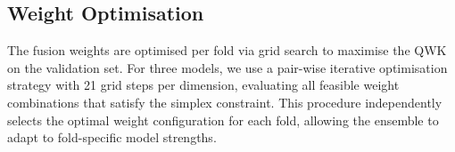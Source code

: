 \subsection{Weight Optimisation}

The fusion weights are optimised per fold via grid search to maximise the QWK on the validation set. For three models, we use a pair-wise iterative optimisation strategy with 21 grid steps per dimension, evaluating all feasible weight combinations that satisfy the simplex constraint. This procedure independently selects the optimal weight configuration for each fold, allowing the ensemble to adapt to fold-specific model strengths.
